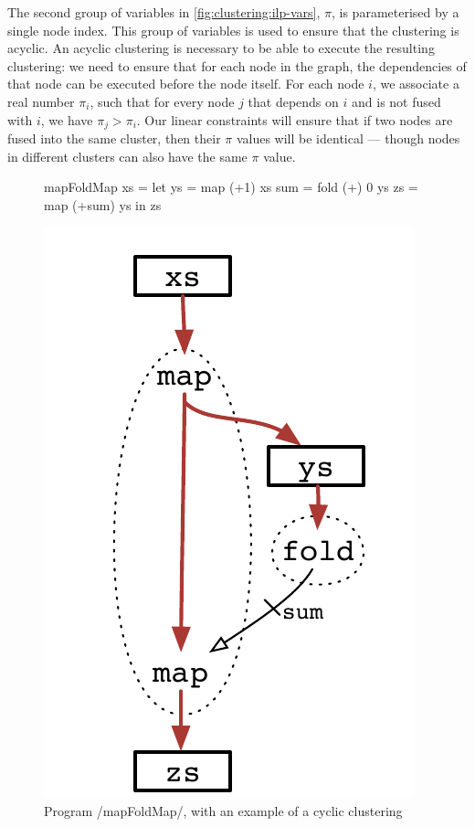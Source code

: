 The second group of variables in \cref{fig:clustering:ilp-vars}, $\pi$, is parameterised by a single node index.
This group of variables is used to ensure that the clustering is acyclic.
An acyclic clustering is necessary to be able to execute the resulting clustering: we need to ensure that for each node in the graph, the dependencies of that node can be executed before the node itself.
For each node $i$, we associate a real number $\pi_i$, such that for every node $j$ that depends on $i$ and is not fused with $i$, we have $\pi_j > \pi_i$.
Our linear constraints will ensure that if two nodes are fused into the same cluster, then their $\pi$ values will be identical --- though nodes in different clusters can also have the same $\pi$ value.

\begin{figure}
\begin{minipage}{0.5\textwidth}
\begin{haskell}
mapFoldMap xs 
 = let ys  = map  (+1)   xs
       sum = fold (+) 0  ys
       zs  = map  (+sum) ys
   in  zs
\end{haskell}
\end{minipage}
\begin{minipage}{0.5\textwidth}
\begin{center}
\includegraphics[scale=0.7]{copy/03-body/clustering/figures/ex3-cyclic.pdf}
\end{center}
\end{minipage}
\caption{Program \Hs/mapFoldMap/, with an example of a cyclic clustering}
\label{clustering:f:cyclic}
\end{figure}


